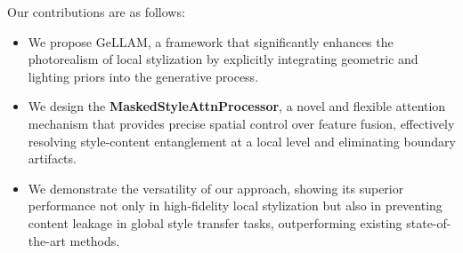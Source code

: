 Our contributions are as follows:
\begin{itemize}
    \item We propose GeLLAM, a framework that significantly enhances the photorealism of local stylization by explicitly integrating geometric and lighting priors into the generative process.
    \item We design the \textbf{MaskedStyleAttnProcessor}, a novel and flexible attention mechanism that provides precise spatial control over feature fusion, effectively resolving style-content entanglement at a local level and eliminating boundary artifacts.
    \item We demonstrate the versatility of our approach, showing its superior performance not only in high-fidelity local stylization but also in preventing content leakage in global style transfer tasks, outperforming existing state-of-the-art methods.
\end{itemize}